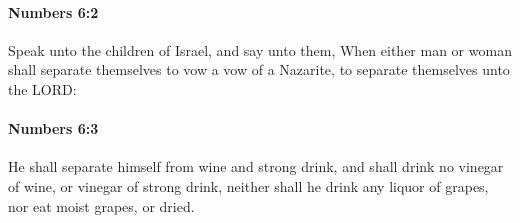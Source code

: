 		\paragraph{Numbers 6:2} %
			\label{NUMBERS-6-2}

			Speak unto the children of Israel, and say unto them, When either man or woman shall separate themselves to vow a vow of a Nazarite, to separate themselves unto the LORD:


		\paragraph{Numbers 6:3} %
			\label{NUMBERS-6-3}

			He shall separate himself from wine and strong drink, and shall drink no vinegar of wine, or vinegar of strong drink, neither shall he drink any liquor of grapes, nor eat moist grapes, or dried.


